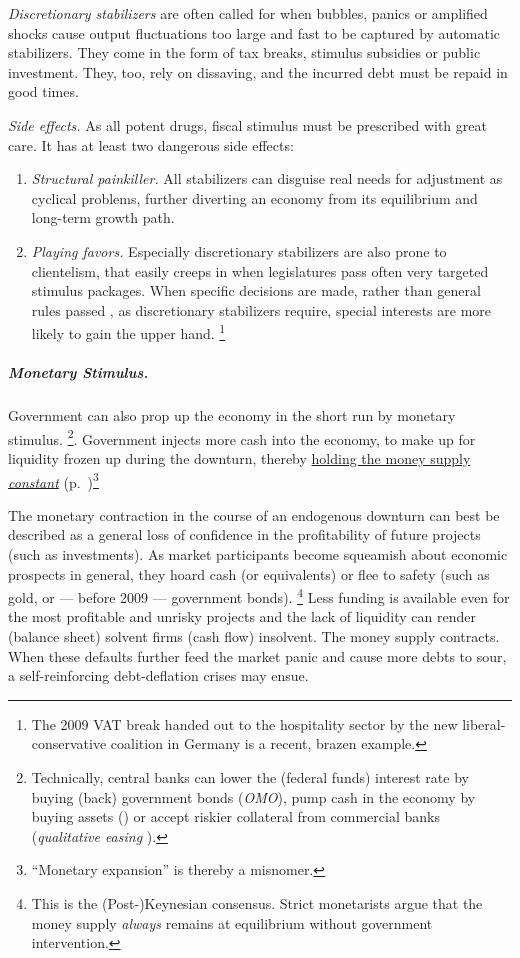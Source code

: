 \emph{Discretionary stabilizers} are often called for when bubbles, panics or amplified shocks cause output fluctuations too large and fast to be captured by automatic stabilizers.
They come in the form of tax breaks, stimulus subsidies or public investment.
They, too, rely on dissaving, and the incurred debt must be repaid in good times.

\emph{Side effects.} As all potent drugs, fiscal stimulus must be prescribed with great care.
It has at least two dangerous side effects:
\begin{enumerate}
	\item \emph{Structural painkiller.} All stabilizers can disguise real needs for adjustment as cyclical problems, further diverting an economy from its equilibrium and long-term growth path.
	\item \emph{Playing favors.} Especially discretionary stabilizers are also prone to clientelism, that easily creeps in when legislatures pass often very targeted stimulus packages.
When specific decisions are made, rather than general rules passed \citep{Weber-1918-aa}, as discretionary stabilizers require, special interests are more likely to gain the upper hand.
	\footnote{
		The 2009 \gls{VAT} break handed out to the hospitality sector by the new liberal-conservative coalition in Germany is a recent, brazen example.
	}
\end{enumerate}

\subparagraph{Monetary Stimulus.}  \label{sec:monetary-stimulus}
Government can also prop up the economy in the short run by monetary stimulus.
\footnote{
	Technically, central banks can lower the (federal funds) interest rate by buying (back) government bonds (\emph{\gls{OMO}}), pump cash in the economy by buying assets () or accept riskier collateral from commercial banks (\emph{qualitative easing} \citep{Buiter2008}).}.
	Government injects more cash into the economy, to make up for liquidity frozen up during the downturn, thereby \hyperref[sec:price-stability]{holding the money supply \emph{constant}} (p.~\pageref{sec:price-stability})\footnote{
	``Monetary expansion'' is thereby a misnomer.
}

The monetary contraction in the course of an endogenous downturn can best be described as a general loss of confidence in the profitability of future projects (such as investments).
As market participants become squeamish about economic prospects in general, they hoard cash (or equivalents) or flee to safety (such as gold, or --- before 2009 --- government bonds).
\footnote{
	This is the (Post-)Keynesian consensus.
	Strict monetarists argue that the money supply \emph{always} remains at equilibrium without government intervention.
}
Less funding is available even for the most profitable and unrisky projects and the lack of liquidity can render (balance sheet) solvent firms (cash flow) insolvent.
The money supply contracts.
When these defaults further feed the market panic and cause more debts to sour, a self-reinforcing debt-deflation crises may ensue.

